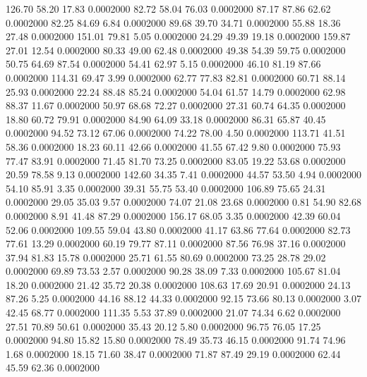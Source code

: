  126.70   58.20   17.83   0.0002000
  82.72   58.04   76.03   0.0002000
  87.17   87.86   62.62   0.0002000
  82.25   84.69    6.84   0.0002000
  89.68   39.70   34.71   0.0002000
  55.88   18.36   27.48   0.0002000
 151.01   79.81    5.05   0.0002000
  24.29   49.39   19.18   0.0002000
 159.87   27.01   12.54   0.0002000
  80.33   49.00   62.48   0.0002000
  49.38   54.39   59.75   0.0002000
  50.75   64.69   87.54   0.0002000
  54.41   62.97    5.15   0.0002000
  46.10   81.19   87.66   0.0002000
 114.31   69.47    3.99   0.0002000
  62.77   77.83   82.81   0.0002000
  60.71   88.14   25.93   0.0002000
  22.24   88.48   85.24   0.0002000
  54.04   61.57   14.79   0.0002000
  62.98   88.37   11.67   0.0002000
  50.97   68.68   72.27   0.0002000
  27.31   60.74   64.35   0.0002000
  18.80   60.72   79.91   0.0002000
  84.90   64.09   33.18   0.0002000
  86.31   65.87   40.45   0.0002000
  94.52   73.12   67.06   0.0002000
  74.22   78.00    4.50   0.0002000
 113.71   41.51   58.36   0.0002000
  18.23   60.11   42.66   0.0002000
  41.55   67.42    9.80   0.0002000
  75.93   77.47   83.91   0.0002000
  71.45   81.70   73.25   0.0002000
  83.05   19.22   53.68   0.0002000
  20.59   78.58    9.13   0.0002000
 142.60   34.35    7.41   0.0002000
  44.57   53.50    4.94   0.0002000
  54.10   85.91    3.35   0.0002000
  39.31   55.75   53.40   0.0002000
 106.89   75.65   24.31   0.0002000
  29.05   35.03    9.57   0.0002000
  74.07   21.08   23.68   0.0002000
   0.81   54.90   82.68   0.0002000
   8.91   41.48   87.29   0.0002000
 156.17   68.05    3.35   0.0002000
  42.39   60.04   52.06   0.0002000
 109.55   59.04   43.80   0.0002000
  41.17   63.86   77.64   0.0002000
  82.73   77.61   13.29   0.0002000
  60.19   79.77   87.11   0.0002000
  87.56   76.98   37.16   0.0002000
  37.94   81.83   15.78   0.0002000
  25.71   61.55   80.69   0.0002000
  73.25   28.78   29.02   0.0002000
  69.89   73.53    2.57   0.0002000
  90.28   38.09    7.33   0.0002000
 105.67   81.04   18.20   0.0002000
  21.42   35.72   20.38   0.0002000
 108.63   17.69   20.91   0.0002000
  24.13   87.26    5.25   0.0002000
  44.16   88.12   44.33   0.0002000
  92.15   73.66   80.13   0.0002000
   3.07   42.45   68.77   0.0002000
 111.35    5.53   37.89   0.0002000
  21.07   74.34    6.62   0.0002000
  27.51   70.89   50.61   0.0002000
  35.43   20.12    5.80   0.0002000
  96.75   76.05   17.25   0.0002000
  94.80   15.82   15.80   0.0002000
  78.49   35.73   46.15   0.0002000
  91.74   74.96    1.68   0.0002000
  18.15   71.60   38.47   0.0002000
  71.87   87.49   29.19   0.0002000
  62.44   45.59   62.36   0.0002000
